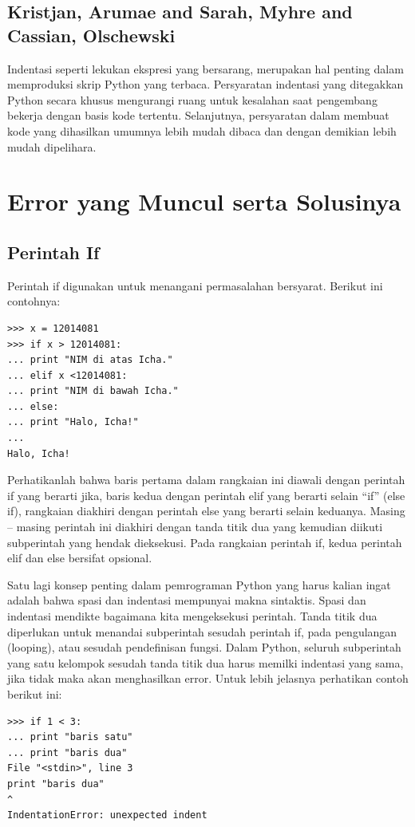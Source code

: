 \documentclass[12pt]{article}
\begin{document}
\subsection{Kristjan, Arumae and Sarah, Myhre and Cassian, Olschewski}
Indentasi seperti lekukan ekspresi yang bersarang, merupakan hal penting dalam memproduksi skrip Python yang terbaca. Persyaratan indentasi yang ditegakkan Python secara khusus mengurangi ruang untuk kesalahan saat pengembang bekerja dengan basis kode tertentu. Selanjutnya, persyaratan dalam membuat kode yang dihasilkan umumnya lebih mudah dibaca dan dengan demikian lebih mudah dipelihara\cite{kristjansoccer}.


\section{Error yang Muncul serta Solusinya}
\subsection{Perintah If}
Perintah if digunakan untuk menangani permasalahan bersyarat. Berikut ini contohnya:
\begin{verbatim}
>>> x = 12014081
>>> if x > 12014081:
... print "NIM di atas Icha."
... elif x <12014081:
... print "NIM di bawah Icha."
... else:
... print "Halo, Icha!"
...
Halo, Icha!
\end{verbatim}

Perhatikanlah bahwa baris pertama dalam rangkaian ini diawali dengan perintah if yang berarti jika, baris kedua dengan perintah elif yang berarti selain “if” (else if), rangkaian diakhiri dengan perintah else yang berarti selain keduanya. Masing – masing perintah ini diakhiri dengan tanda titik dua yang kemudian diikuti subperintah yang hendak dieksekusi. Pada rangkaian perintah if, kedua perintah elif dan else bersifat opsional.

Satu lagi konsep penting dalam pemrograman Python yang harus kalian ingat adalah bahwa spasi dan indentasi mempunyai makna sintaktis. Spasi dan indentasi mendikte bagaimana kita mengeksekusi perintah. Tanda titik dua diperlukan untuk menandai subperintah sesudah perintah if, pada pengulangan (looping), atau sesudah pendefinisan fungsi. Dalam Python, seluruh subperintah yang satu kelompok sesudah tanda titik dua harus memilki indentasi yang sama, jika tidak maka akan menghasilkan error. Untuk lebih jelasnya perhatikan contoh berikut ini:

\begin{verbatim}
>>> if 1 < 3:
... print "baris satu"
... print "baris dua"
File "<stdin>", line 3
print "baris dua"
^
IndentationError: unexpected indent
\end{verbatim}
\end{document}
